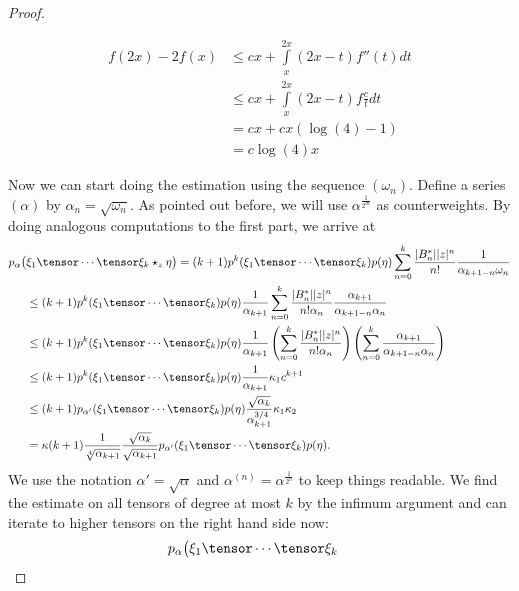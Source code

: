 \documentclass[
11pt,                          %
english                        %
]{article}
\begin{document}
\begin{proof}
\begin{subproof}
		\begin{align*}
			f(2x) - 2 f(x)
			& \leq
			cx + \int\limits_x^{2x} (2x-t) f''(t) dt
			\\
			& \leq
			cx + 
			\int\limits_x^{2x} (2x-t) f\frac{c}{t} dt
			\\
			&=
			cx + cx (\log(4) - 1)
			\\
			&=
			c \log(4) x
		\end{align*}
	\end{subproof}
	Now we can start doing the estimation using the sequence $(\omega_n)$. 
	Define a series $(\alpha)$ by $\alpha_n = \sqrt{\omega_n}$. As pointed out 
	before, we will use $\alpha^{\frac{1}{2^m}}$ as counterweights.
	By doing analogous computations to the first part, we arrive at
	\begin{align*}
		p_\alpha \big(
		&
			\xi_1 \tensor \cdots \tensor \xi_k
			\star_z
			\eta
		\big)
		=
		(k+1) 
		p^k(\xi_1 \tensor \cdots \tensor \xi_k)
		p(\eta)
		\sum\limits_{n=0}^k
		\frac{|B_n^*| |z|^n}{n!}
		\frac{1}{\alpha_{k+1-n} \omega_n}
		\\
		& \leq
		(k+1) 
		p^k(\xi_1 \tensor \cdots \tensor \xi_k)
		p(\eta)
		\frac{1}{\alpha_{k+1}}
		\sum\limits_{n=0}^k
		\frac{|B_n^*| |z|^n}{n! \alpha_n}
		\frac{\alpha_{k+1}}{\alpha_{k+1-n} \alpha_n}
		\\
		& \leq
		(k+1) 
		p^k(\xi_1 \tensor \cdots \tensor \xi_k)
		p(\eta)
		\frac{1}{\alpha_{k+1}}
		\left(
			\sum\limits_{n=0}^k
			\frac{|B_n^*| |z|^n}{n! \alpha_n}
		\right)
		\left(
			\sum\limits_{n=0}^k
			\frac{\alpha_{k+1}}{\alpha_{k+1-n} \alpha_n}
		\right)
		\\
		& \leq
		(k+1) 
		p^k(\xi_1 \tensor \cdots \tensor \xi_k)
		p(\eta)
		\frac{1}{\alpha_{k+1}}
		\kappa_1
		c^{k+1}
		\\
		& \leq
		(k+1) 
		p_{\alpha'}(\xi_1 \tensor \cdots \tensor \xi_k)
		p(\eta)
		\frac{\sqrt{\alpha_k}}{\alpha_{k+1}^{3/4}}
		\kappa_1
		\kappa_2
		\\
		&=
		\kappa
		(k+1)
		\frac{1}{\sqrt[4]{\alpha_{k+1}}}
		\frac{\sqrt{\alpha_k}}{\sqrt{\alpha_{k+1}}}
		p_{\alpha'}(\xi_1 \tensor \cdots \tensor \xi_k)
		p(\eta).
	\end{align*}
	We use the notation $\alpha' = \sqrt{\alpha}$ and $\alpha^{(n)} = 
	\alpha^{\frac{1}{2^n}}$ to keep things readable. We find the estimate on all 
	tensors of degree at most $k$ by the infimum argument and can iterate to higher 
	tensors on the right hand side now:
	\begin{align*}
		p_\alpha \big(
		&
			\xi_1 \tensor \cdots \tensor \xi_k

\end{align*}
\end{proof}
\end{document}
